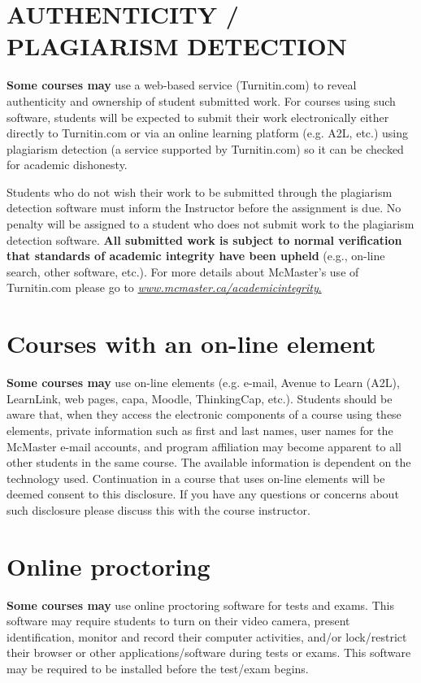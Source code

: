 \documentclass[12pt]{article}
\begin{document}
\section*{AUTHENTICITY / PLAGIARISM DETECTION}

\textbf{Some courses may} use a web-based service (Turnitin.com)
to reveal authenticity and ownership of student submitted work. For
courses using such software, students will be expected to submit their
work electronically either directly to Turnitin.com or via an online
learning platform (e.g. A2L, etc.) using plagiarism detection (a service
supported by Turnitin.com) so it can be checked for academic dishonesty.

Students who do not wish their work to be submitted through the
plagiarism detection software must inform the Instructor before the
assignment is due. No penalty will be assigned to a student who does not
submit work to the plagiarism detection software. \textbf{All submitted
work is subject to normal verification that standards of academic
integrity have been upheld} (e.g., on-line search, other software,
etc.). For more details about McMaster's use of Turnitin.com please go
to
\href{http://www.mcmaster.ca/academicintegrity}{\emph{www.mcmaster.ca/academicintegrity}.}

\section*{Courses with an on-line element}

\textbf{Some courses may} use on-line elements (e.g. e-mail,
Avenue to Learn (A2L), LearnLink, web pages, capa, Moodle, ThinkingCap,
etc.). Students should be aware that, when they access the electronic
components of a course using these elements, private information such as
first and last names, user names for the McMaster e-mail accounts, and
program affiliation may become apparent to all other students in the
same course. The available information is dependent on the technology
used. Continuation in a course that uses on-line elements will be deemed
consent to this disclosure. If you have any questions or concerns about
such disclosure please discuss this with the course instructor.

\section*{Online proctoring}

\textbf{Some courses may} use online proctoring software for tests and
exams. This software may require students to turn on their video camera,
present identification, monitor and record their computer activities,
and/or lock/restrict their browser or other applications/software during
tests or exams. This software may be required to be installed before the
test/exam begins.
\end{document}

